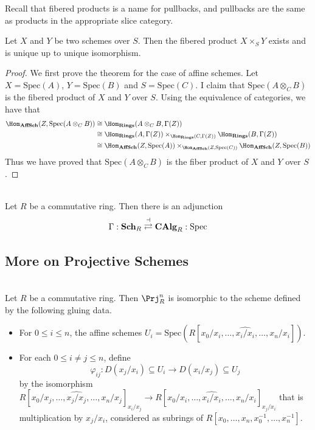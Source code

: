 \documentclass[a4paper]{article}
\begin{document}
Recall that fibered products is a name for pullbacks, and pullbacks are the same as products in the appropriate slice category. 

\begin{prp}{}{} Let $X$ and $Y$ be two schemes over $S$. Then the fibered product $X\times_SY$ exists and is unique up to unique isomorphism. 
\begin{proof}
We first prove the theorem for the case of affine schemes. Let $X=\text{Spec}(A)$, $Y=\text{Spec}(B)$ and $S=\text{Spec}(C)$. I claim that $\text{Spec}(A\otimes_CB)$ is the fibered product of $X$ and $Y$ over $S$. Using the equivalence of categories, we have that 
\begin{align*}
\Hom_\bold{AffSch}(Z,\text{Spec}(A\otimes_CB))&\cong\Hom_\bold{Rings}(A\otimes_CB,\Gamma(Z))\\
&\cong\Hom_\bold{Rings}(A,\Gamma(Z))\times_{\Hom_\bold{Rings}(C,\Gamma(Z))}\Hom_\bold{Rings}(B,\Gamma(Z))\\
&\cong\Hom_\bold{AffSch}(Z,\text{Spec}(A))\times_{\Hom_\bold{AffSch}(Z,\text{Spec}(C))}\Hom_\bold{AffSch}(Z,\text{Spec}(B))
\end{align*}
Thus we have proved that $\text{Spec}(A\otimes_CB)$ is the fiber product of $X$ and $Y$ over $S$. 
\end{proof}
\end{prp}

\begin{prp}{}{}\\
Let $R$ be a commutative ring. Then there is an adjunction $$\Gamma:\bold{Sch}_R\overset{\dashv}{\rightleftarrows}\bold{CAlg}_R:\text{Spec}$$
\end{prp}

\subsection{More on Projective Schemes}
\begin{lmm}{}{}\\
Let $R$ be a commutative ring. Then $\Prj_R^n$ is isomorphic to the scheme defined by the following gluing data. 
\begin{itemize}
\item For $0\leq i\leq n$, the affine schemes $U_i=\text{Spec}(R[x_0/x_i,\dots,\widehat{x_i/x_i},\dots,x_n/x_i])$. 
\item For each $0\leq i\neq j\leq n$, define $$\varphi_{ij}:D(x_j/x_i)\subseteq U_i\to D(x_i/x_j)\subseteq U_j$$ by the isomorphism $R[x_0/x_j,\dots,\widehat{x_j/x_j},\dots,x_n/x_j]_{x_i/x_j}\to R[x_0/x_i,\dots,\widehat{x_i/x_i},\dots,x_n/x_i]_{x_j/x_i}$ that is multiplication by $x_j/x_i$, considered as subrings of $R[x_0,\dots,x_n,x_0^{-1},\dots,x_n^{-1}]$. 
\end{itemize}
\end{lmm}
\end{document}
